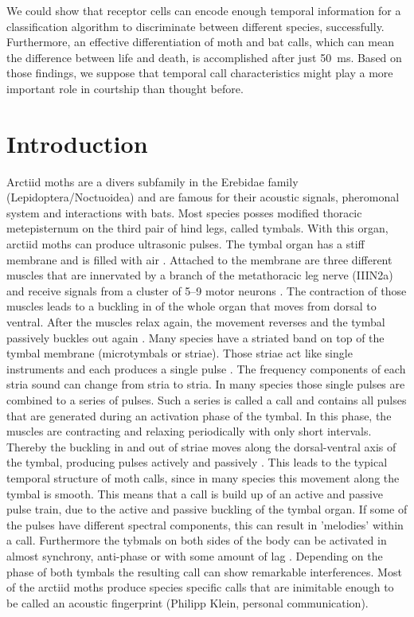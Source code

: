 \documentclass[12pt,a4paper,pdftex]{article}
\begin{document}
We could show that receptor cells can encode enough temporal information for a classification algorithm to discriminate between different species, successfully. Furthermore, an effective differentiation of moth and bat calls, which can mean the difference between life and death, is accomplished after just 50~ms. Based on those findings, we suppose that temporal call characteristics might play a more important role in courtship than thought before.   
\newpage

\section*{Introduction}
Arctiid moths are a divers subfamily in the Erebidae family (Lepidoptera/Noctuoidea) and are famous for their acoustic signals, pheromonal system and interactions with bats. Most species posses modified thoracic metepisternum on the third  pair of hind legs, called tymbals. With this organ, arctiid moths can produce ultrasonic pulses. The tymbal organ has a stiff membrane and is filled with air \cite{blest1963, fullard1977, fullard1990}. Attached to the membrane are three different muscles that are innervated by a branch of the metathoracic leg nerve (IIIN2a) and receive signals from a cluster of 5--9 motor neurons \cite{nuesch1957, fullard1992}. The contraction of those muscles leads to a buckling in of the whole organ that moves from dorsal to ventral. After the muscles relax again, the movement reverses and the tymbal passively buckles out again \cite{blest1963}. Many species have a striated band on top of the tymbal membrane (microtymbals or striae). Those striae act like single instruments and each produces a single pulse \cite{blest1963, fullard1977, fullard1990, weller1999}. 
The frequency components of each stria sound can change from stria to stria. In many species those single pulses are combined to a series of pulses. Such a series is called a call and contains all pulses that are generated during an activation phase of the tymbal. In this phase, the muscles are contracting and relaxing periodically with only short intervals. Thereby the buckling in and out of striae moves along the dorsal-ventral axis of the tymbal, producing pulses actively and passively \cite{corcoran2010}. This leads to the typical temporal structure of moth calls, since in many species this movement along the tymbal is smooth. This means that a call is build up of an active and passive pulse train, due to the active and passive buckling of the tymbal organ. If some of the pulses have different spectral components, this can result in 'melodies' within a call. Furthermore the tybmals on both sides of the body can be activated in almost synchrony, anti-phase or with some amount of lag \cite{fullard1977}. Depending on the phase of both tymbals the resulting call can show remarkable interferences. Most of the arctiid moths produce species specific calls that are inimitable enough to be called an acoustic fingerprint (Philipp Klein, personal communication). 
\end{document}

